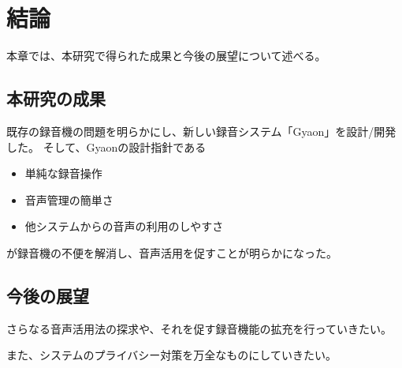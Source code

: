 \chapter{結論}
\label{chap:conclusion}

本章では、本研究で得られた成果と今後の展望について述べる。

\newpage

\section{本研究の成果}

既存の録音機の問題を明らかにし、新しい録音システム「Gyaon」を設計/開発した。
そして、Gyaonの設計指針である

\begin{itemize}
\item 単純な録音操作
\item 音声管理の簡単さ
\item 他システムからの音声の利用のしやすさ
\end{itemize}

が録音機の不便を解消し、音声活用を促すことが明らかになった。

\section{今後の展望}

さらなる音声活用法の探求や、それを促す録音機能の拡充を行っていきたい。

また、システムのプライバシー対策を万全なものにしていきたい。
